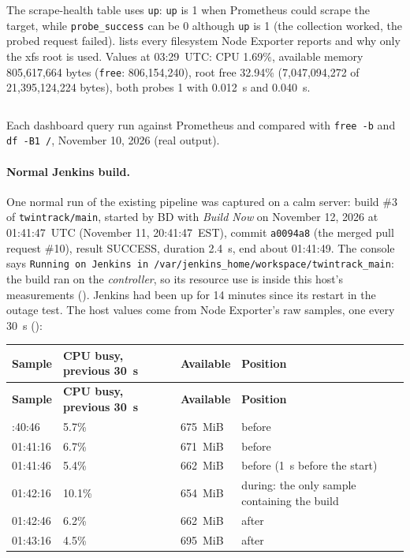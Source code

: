 The scrape-health table uses \texttt{up}: \texttt{up} is 1 when Prometheus could scrape the target, while \texttt{probe\_success} can be 0 although \texttt{up}
is 1 (the collection worked, the probed request failed).  lists every filesystem Node Exporter reports and why only the xfs root is used.
Values at 03:29~UTC: CPU 1.69\%, available memory 805,617,664 bytes (\texttt{free}: 806,154,240), root free 32.94\% (7,047,094,272 of 21,395,124,224 bytes),
both probes 1 with 0.012~s and 0.040~s.

\begin{longlisting}
\inputminted[fontsize=\scriptsize]{text}{evidence/142-dashboard-queries-checked-against-prometheus-and-host-bd-2026-11-10.txt}
\caption{Each dashboard query run against Prometheus and compared with \texttt{free -b} and \texttt{df -B1 /}, November 10, 2026 (real output).}
\label{Listing:E142}
\end{longlisting}

\paragraph{Normal Jenkins build.} One normal run of the existing pipeline was captured on a calm server: build \#3 of
\texttt{twintrack/main}, started by BD with \emph{Build Now} on November 12, 2026 at 01:41:47~UTC (November 11, 20:41:47~EST), commit
\texttt{a0094a8} (the merged pull request \#10), result SUCCESS, duration 2.4~s, end about 01:41:49. The console says
\texttt{Running on Jenkins in /var/jenkins\_home/workspace/twintrack\_main}: the build ran on the \emph{controller}, so its resource
use is inside this host's measurements (). Jenkins had been up for 14 minutes since its restart in the outage test.
The host values come from Node Exporter's raw samples, one every 30~s ():

\begin{tabularx}{\linewidth}{L{3.2cm}L{3.4cm}L{2.6cm}Y}
\caption{Host CPU and available memory around build \#3 (UTC, 30~s samples)\label{Table:SreBuildSamples}}\\
\toprule \textbf{Sample} & \textbf{CPU busy, previous 30~s} & \textbf{Available} & \textbf{Position}\\ \midrule
\endfirsthead
\toprule \textbf{Sample} & \textbf{CPU busy, previous 30~s} & \textbf{Available} & \textbf{Position}\\ \midrule
\endhead \bottomrule {}:40:46 & 5.7\% & 675~MiB & before\\
01:41:16 & 6.7\% & 671~MiB & before\\
01:41:46 & 5.4\% & 662~MiB & before (1~s before the start)\\
01:42:16 & 10.1\% & 654~MiB & during: the only sample containing the build\\
01:42:46 & 6.2\% & 662~MiB & after\\
01:43:16 & 4.5\% & 695~MiB & after\\
\end{tabularx}

